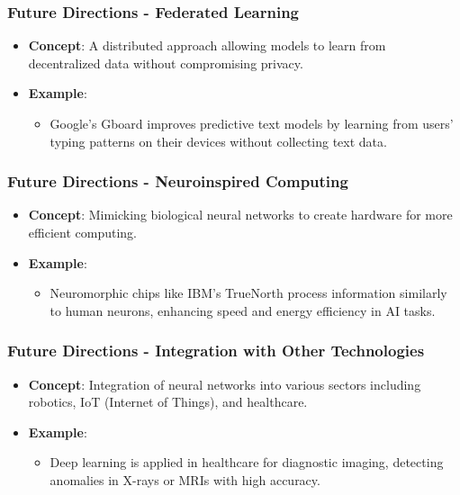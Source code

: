 \documentclass{beamer}
\begin{document}
\begin{frame}[fragile]
    \frametitle{Future Directions - Federated Learning}
    \begin{itemize}
        \item \textbf{Concept}: A distributed approach allowing models to learn from decentralized data without compromising privacy.
        \item \textbf{Example}:
        \begin{itemize}
            \item Google’s Gboard improves predictive text models by learning from users' typing patterns on their devices without collecting text data.
        \end{itemize}
    \end{itemize}
\end{frame}

\begin{frame}[fragile]
    \frametitle{Future Directions - Neuroinspired Computing}
    \begin{itemize}
        \item \textbf{Concept}: Mimicking biological neural networks to create hardware for more efficient computing.
        \item \textbf{Example}:
        \begin{itemize}
            \item Neuromorphic chips like IBM's TrueNorth process information similarly to human neurons, enhancing speed and energy efficiency in AI tasks.
        \end{itemize}
    \end{itemize}
\end{frame}

\begin{frame}[fragile]
    \frametitle{Future Directions - Integration with Other Technologies}
    \begin{itemize}
        \item \textbf{Concept}: Integration of neural networks into various sectors including robotics, IoT (Internet of Things), and healthcare.
        \item \textbf{Example}:
        \begin{itemize}
            \item Deep learning is applied in healthcare for diagnostic imaging, detecting anomalies in X-rays or MRIs with high accuracy.
        \end{itemize}
    \end{itemize}
\end{frame}
\end{document}

